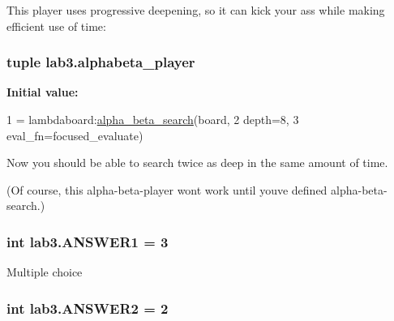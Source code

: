 This player uses progressive deepening, so it can kick your ass while making efficient use of time\+: 

\hypertarget{namespacelab3_aa4790555a33d7ee8155ff4358799617a}{}
\subsubsection[{alphabeta\+\_\+player}]{\setlength{\rightskip}{0pt plus 5cm}tuple lab3.\+alphabeta\+\_\+player}\label{namespacelab3_aa4790555a33d7ee8155ff4358799617a}
{\bfseries Initial value\+:}
\begin{DoxyCode}
1 = lambdaboard:\hyperlink{namespacelab3_a7ead0dd82f5946316600e9a937e55037}{alpha\_beta\_search}(board,
2                                                    depth=8,
3                                                    eval\_fn=focused\_evaluate)
\end{DoxyCode}


Now you should be able to search twice as deep in the same amount of time. 

(Of course, this alpha-\/beta-\/player won\textquotesingle{}t work until you\textquotesingle{}ve defined alpha-\/beta-\/search.) \hypertarget{namespacelab3_ad2e45b0f85fa13d33b881635810e83e8}{}
\subsubsection[{A\+N\+S\+W\+E\+R1}]{\setlength{\rightskip}{0pt plus 5cm}int lab3.\+A\+N\+S\+W\+E\+R1 = 3}\label{namespacelab3_ad2e45b0f85fa13d33b881635810e83e8}

\begin{DoxyEnumerate}
\item Multiple choice 
\end{DoxyEnumerate}\hypertarget{namespacelab3_a988f22c9cf01e9e09a7df386ff76a739}{}
\subsubsection[{A\+N\+S\+W\+E\+R2}]{\setlength{\rightskip}{0pt plus 5cm}int lab3.\+A\+N\+S\+W\+E\+R2 = 2}\label{namespacelab3_a988f22c9cf01e9e09a7df386ff76a739}
\hypertarget{namespacelab3_af72a06890c8de2fae05fc82044aa76be}{}
